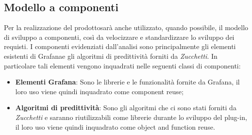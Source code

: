 \subsection{Modello a componenti}
Per la realizzazione del prodotto\glosp sarà anche utilizzato, quando possibile, il modello di sviluppo a componenti, così da velocizzare e standardizzare lo sviluppo dei requisti.
I componenti evidenziati dall'analisi sono principalmente gli elementi esistenti di Grafana\glosp e gli algoritmi di predittività forniti da \textit{Zucchetti}.
In particolare tali elementi vengono inquadrati nelle seguenti classi di componenti:
\begin{itemize}
	\item \textbf{Elementi Grafana}\glo: Sono le librerie e le funzionalità fornite da Grafana\glo, il loro uso viene quindi inquadrato come component reuse;
	\item \textbf{Algoritmi di predittività}: Sono gli algoritmi che ci sono stati forniti da \textit{Zucchetti} e saranno riutilizzabili come librerie durante lo sviluppo del plug-in, il loro uso viene quindi inquadrato come object and function reuse.
\end{itemize}
